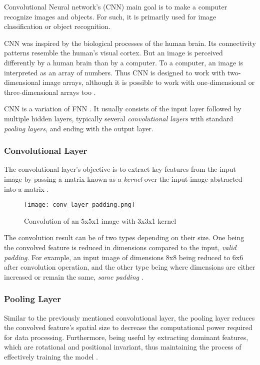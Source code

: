 Convolutional Neural network's (CNN) main goal is to make a computer recognize images and objects. For such, it is primarily used for image classification or object recognition.

CNN was inspired by the biological processes of the human brain. Its connectivity patterns resemble the human's visual cortex. But an image is perceived differently by a human brain than by a computer. To a computer, an image is interpreted as an array of numbers. Thus CNN is designed to work with two-dimensional image arrays, although it is possible to work with one-dimensional or three-dimensional arrays too \cite{mlmastery}.

CNN is a variation of FNN \cite{Goodfellow-et-al-2016}. It usually consists of the input layer followed by multiple hidden layers, typically several \textit{convolutional layers} with standard \textit{pooling layers}, and ending with the output layer. 

\subsubsection{Convolutional Layer}

The convolutional layer's objective is to extract key features from the input image by passing a matrix known as a \textit{kernel} over the input image abstracted into a matrix \cite{mathworkscnn}.

\begin{figure}[h]
	\centering
    \texttt{[image: conv\_layer\_padding.png]}
	\caption{Convolution of an 5x5x1 image with 3x3x1 kernel \cite{compguideCnn}}
	\label{fig:cnn_conv}
\end{figure}


The convolution result can be of two types depending on their size. One being the convolved feature is reduced in dimensions compared to the input, \textit{valid padding}. For example, an input image of dimensions 8x8 being reduced to 6x6 after convolution operation, and the other type being where dimensions are either increased or remain the same, \textit{same padding} \cite{compguideCnn}.

\subsubsection{Pooling Layer}


Similar to the previously mentioned convolutional layer, the pooling layer reduces the convolved feature's spatial size to decrease the computational power required for data processing. Furthermore, being useful by extracting dominant features, which are rotational and positional invariant, thus maintaining the process of effectively training the model \cite{compguideCnn}.

